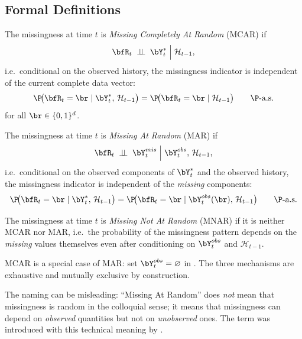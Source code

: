 \subsection{Formal Definitions}

\begin{definition}
\label{def:mcar}
The missingness at time $t$ is \emph{Missing Completely At Random} (MCAR) if
\[
  \bfR_t \;\perp\!\!\!\perp\; \bY_t^*
  \;\Big|\; \mathcal{H}_{t-1},
\]
i.e.\ conditional on the observed history, the missingness indicator is
independent of the current complete data vector:
\[
  \P\!\bigl(\bfR_t = \br \mid \bY_t^*,\,\mathcal{H}_{t-1}\bigr)
  = \P\!\bigl(\bfR_t = \br \mid \mathcal{H}_{t-1}\bigr)
  \qquad \P\text{-a.s.}
\]
for all $\br\in\{0,1\}^d$.
\end{definition}

\begin{definition}
\label{def:mar}
The missingness at time $t$ is \emph{Missing At Random} (MAR) if
\[
  \bfR_t \;\perp\!\!\!\perp\; \bY_t^{mis}
  \;\Big|\; \bY_t^{obs},\,\mathcal{H}_{t-1},
\]
i.e.\ conditional on the observed components of $\bY_t^*$ and the observed
history, the missingness indicator is independent of the \emph{missing}
components:
\[
  \P\!\bigl(\bfR_t = \br \mid \bY_t^*,\,\mathcal{H}_{t-1}\bigr)
  = \P\!\bigl(\bfR_t = \br \mid \bY_t^{obs}(\br),\,\mathcal{H}_{t-1}\bigr)
  \qquad \P\text{-a.s.}
\]
\end{definition}

\begin{definition}
\label{def:mnar}
The missingness at time $t$ is \emph{Missing Not At Random} (MNAR) if it is
neither MCAR nor MAR, i.e.\ the probability of the missingness pattern
depends on the \emph{missing} values themselves even after conditioning on
$\bY_t^{obs}$ and $\mathcal{H}_{t-1}$.
\end{definition}

\begin{remark}
\label{rem:mcar_implies_mar}
MCAR is a special case of MAR: set $\bY_t^{obs}=\varnothing$ in
.  The three mechanisms are exhaustive and mutually
exclusive by construction.

The naming can be misleading: ``Missing At Random'' does \emph{not} mean
that missingness is random in the colloquial sense; it means that missingness
can depend on \emph{observed} quantities but not on \emph{unobserved}
ones.  The term was introduced with this technical meaning by
\citet{rubin1976}.
\end{remark}

